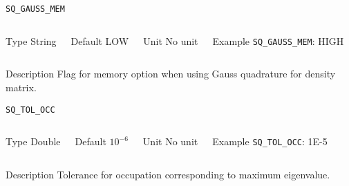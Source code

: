 \begin{frame}[allowframebreaks]{\texttt{SQ\_GAUSS\_MEM}} \label{SQ_GAUSS_MEM}
\vspace*{-12pt}
\begin{columns}
\begin{block}{Type}
String
\end{block}

\begin{block}{Default}
LOW
\end{block}

\begin{block}{Unit}
No unit
\end{block}

\begin{block}{Example}
\texttt{SQ\_GAUSS\_MEM}: HIGH
\end{block}
\end{columns}

\begin{block}{Description}
Flag for memory option when using Gauss quadrature for density matrix. 
\end{block}

\end{frame}

\begin{frame}[allowframebreaks]{\texttt{SQ\_TOL\_OCC}} \label{SQ_TOL_OCC}
\vspace*{-12pt}
\begin{columns}
\begin{block}{Type}
Double
\end{block}

\begin{block}{Default}
$10^{-6}$
\end{block}

\begin{block}{Unit}
No unit
\end{block}

\begin{block}{Example}
\texttt{SQ\_TOL\_OCC}: 1E-5
\end{block}
\end{columns}

\begin{block}{Description}
Tolerance for occupation corresponding to maximum eigenvalue.
\end{block}

\end{frame}


